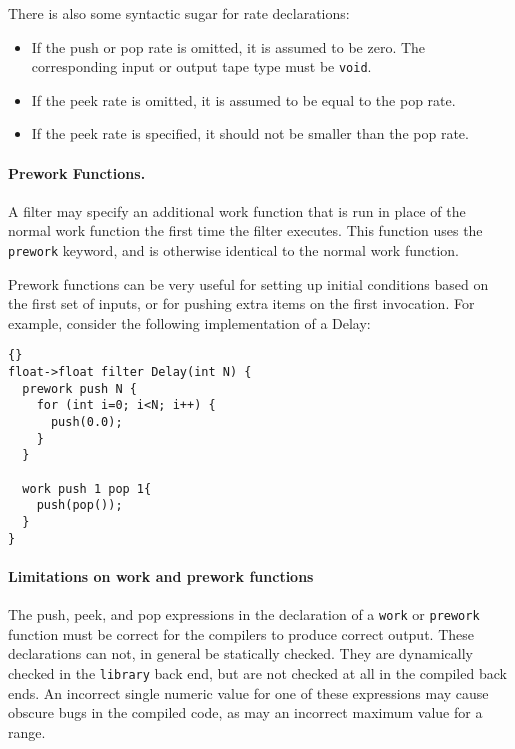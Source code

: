 \documentclass[11pt]{article}
\begin{document}
\noindent There is also some syntactic sugar for rate declarations:

\begin{itemize}

\item If the push or pop rate is omitted, it is assumed to be zero.
The corresponding input or output tape type must be \lstinline|void|.

\item If the peek rate is omitted, it is assumed to be equal to the
pop rate.

\item If the peek rate is specified, it should not be smaller than the
pop rate.


\end{itemize}

\paragraph{Prework Functions.}  A filter may specify an additional work 
function that is run in place of the normal work function the first
time the filter executes.  This function uses the \lstinline|prework|
keyword, and is otherwise identical to the normal work function.

Prework functions can be very useful for setting up initial conditions
based on the first set of inputs, or for pushing extra items on the
first invocation.  For example, consider the following implementation
of a Delay:

\begin{lstlisting}{}
float->float filter Delay(int N) {
  prework push N {
    for (int i=0; i<N; i++) {
      push(0.0);
    }
  }

  work push 1 pop 1{
    push(pop());
  }
}
\end{lstlisting}

\paragraph{Limitations on work and prework functions}
The push, peek, and pop expressions
in the declaration of a \lstinline|work| or \lstinline|prework| function
must be correct for the compilers to produce correct output.  These
declarations can not, in general be statically checked.  They are
dynamically checked in the \lstinline|library| back end, but are not
checked at all in the compiled back ends.  An incorrect single numeric value
for one of these expressions may cause obscure bugs in the compiled
code, as may an incorrect maximum value for a range.
\end{document}
